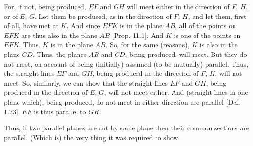\begin{Parallel}{}{}
{For, if not, being produced, $EF$ and $GH$ will  meet either in the direction of $F$, $H$, 
 or of $E$, $G$. Let them  be produced, as  in the  direction of $F$, $H$, and let them, first of all, have met at $K$. And since $EFK$ is in the plane $AB$, all
 of the points on $EFK$ are thus also in the plane $AB$ [Prop. 11.1]. And $K$ is one of the points on $EFK$. Thus, $K$ is in the
 plane $AB$. So, for the same (reasons), $K$ is also in the plane $CD$. 
 Thus, the planes $AB$ and $CD$, being produced, will meet. But they do
 not meet, on account of being (initially) assumed (to be mutually) parallel. Thus,
 the straight-lines $EF$ and $GH$, being produced in the
direction of $F$, $H$, will not meet. So, similarly, we can show that the straight-lines
 $EF$ and $GH$, being produced in the direction of $E$, $G$, will not meet
 either. And (straight-lines in one plane which), being produced,  do not meet in either direction
 are parallel [Def. 1.23]. $EF$ is thus parallel to $GH$.
 
 Thus, if two parallel planes are cut by some plane
then their common sections are parallel. (Which is) the very thing it was
required to show.}
\end{Parallel}

